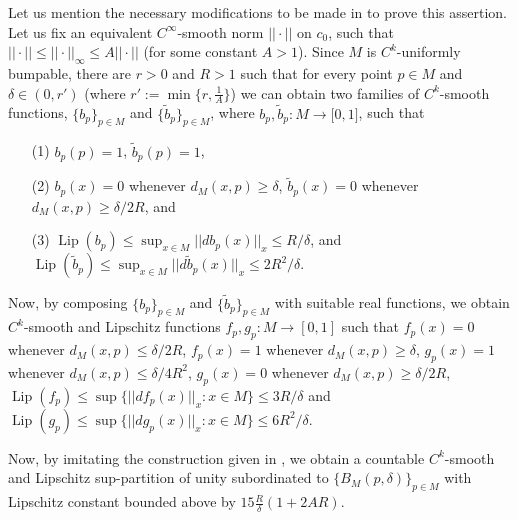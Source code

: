 \documentclass[11pt]{amsart}
\numberwithin{equation}{section}
\begin{document}
\medskip

Let us mention the necessary modifications to be made in \cite{Fry1, azafrymon}
to prove this assertion.  Let us fix an equivalent $C^\infty$-smooth norm $||\cdot||$ on $c_0$, such that $||\cdot||\le ||\cdot||_\infty \le A ||\cdot||$ (for some constant
$A>1$). Since $M$ is $C^k$-uniformly bumpable, there are $r>0$ and $R>1$ such that for every point $p\in M$ and $\delta\in (0,r')$ (where $r':=\min\{r,\frac{1}{A}\}$) we can obtain  two families of $C^k$-smooth functions, $\{b_p\}_{p\in M}$  and $\{\widetilde{b}_p\}_{p\in M}$, where $b_p, \widetilde{b}_p:M\rightarrow \mathbb [0,1]$, such that
\begin{itemize}
\item[(1)] $b_p(p)=1$, $\widetilde{b}_p(p)=1$,
\item[(2)] $b_p(x)=0$ whenever $d_M(x,p)\ge \delta$, $\widetilde{b}_p(x)=0$ whenever $d_M(x,p)\ge \delta/2R$, and
\item[(3)] ${\operatorname{Lip}}(b_p)\le \sup_{x\in M} ||d b_p(x)||_x \le R/\delta$, and ${\operatorname{Lip}}(\widetilde{b}_p)\le \sup_{x\in M} ||d \widetilde{b}_p(x)||_x \le 2R^2/\delta$.
\end{itemize}
Now, by composing $\{b_p\}_{p\in M}$  and $\{\widetilde{b}_p\}_{p\in M}$ with suitable real functions, we obtain $C^k$-smooth and Lipschitz functions $f_p,g_p:M\to [0,1]$  such that $f_p(x)=0$ whenever $d_M(x,p)\le \delta/2R$, $f_p(x)=1$ whenever $d_M(x,p)\ge\delta$, $g_p(x)=1$ whenever $d_M(x,p)\le \delta/4R^2$, $g_p(x)=0$ whenever $d_M(x,p)\ge \delta/2R$,
${\operatorname{Lip}}(f_p)\le \sup\{||d f_p(x)||_x:x\in M\}\le 3R/\delta$ and  ${\operatorname{Lip}}(g_p)\le \sup\{||dg_p(x)||_x:x\in M\}\le 6R^2/\delta$.

Now, by imitating the construction given in \cite{azafrymon, Fry1}, we obtain a  countable $C^k$-smooth and Lipschitz sup-partition of unity subordinated to $\{B_M(p,\delta)\}_{p\in M}$ with Lipschitz constant  bounded above by $15 \frac{R}{\delta} (1+2AR)$.

\medskip
\end{document}
